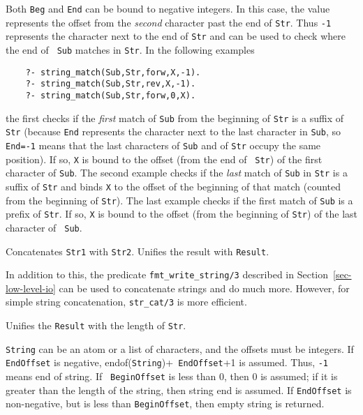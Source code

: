 \begin{description}
Both {\tt Beg} and {\tt End} can be bound to negative integers.
In this case, the value represents the offset from the \emph{second}
character past the end of {\tt Str}. Thus {\tt -1} represents the character
next to the end of {\tt Str} and can be used to check where the end of {\tt
  Sub}  matches in {\tt Str}. In the following examples
\begin{verbatim}
    ?- string_match(Sub,Str,forw,X,-1).  
    ?- string_match(Sub,Str,rev,X,-1).  
    ?- string_match(Sub,Str,forw,0,X).  
\end{verbatim}
the first checks if the \emph{first} match of {\tt Sub} from the beginning
of {\tt Str} is a suffix of {\tt Str} (because {\tt End} represents the
character next to the last character in {\tt Sub}, so {\tt End=-1} means
that the last characters of {\tt Sub} and of {\tt Str} occupy the same
position). If so, {\tt X} is bound to the offset (from the end of {\tt
  Str}) of the first character of {\tt Sub}. The second example checks if
the \emph{last} match of {\tt Sub} in {\tt Str} is a suffix of {\tt Str}
and binds {\tt X} to the offset of the beginning of that match (counted
from the beginning of {\tt Str}).  The last example checks if the first
match of {\tt Sub} is a prefix of {\tt Str}. If so, {\tt X} is bound to the
offset (from the beginning of {\tt Str}) of the last character of {\tt
  Sub}.
 

        
Concatenates {\tt Str1} with {\tt Str2}. Unifies the result with {\tt Result}.

In addition to this, the predicate \verb|fmt_write_string/3| described in
Section~\ref{sec-low-level-io} can be used to concatenate strings and do
much more. However, for simple string concatenation, {\tt str\_cat/3} is
more efficient.


Unifies the {\tt Result}  with the length of {\tt Str}.

{\tt String} can be an atom or a list of characters, and the offsets must
be integers.  If {\tt EndOffset} is negative, endof({\tt String})+{\tt
  EndOffset}+1 is assumed. Thus, {\tt -1} means end of string.  If {\tt
  BeginOffset} is less than 0, then 0 is assumed; if it is greater than the
length of the string, then string end is assumed. If {\tt EndOffset} is
non-negative, but is less than {\tt BeginOffset}, then empty string is
returned.


\end{description}
